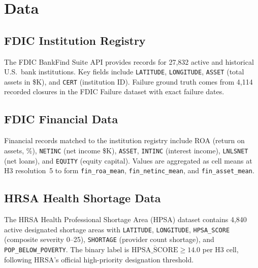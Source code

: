 \documentclass[conference]{IEEEtran}
\begin{document}
\section{Data}
\subsection{FDIC Institution Registry}
The FDIC BankFind Suite API provides records for 27,832 active and
historical U.S.\ bank institutions. Key fields include \texttt{LATITUDE},
\texttt{LONGITUDE}, \texttt{ASSET} (total assets in \$K), and
\texttt{CERT} (institution ID). Failure ground truth comes from 4,114
recorded closures in the FDIC Failure dataset with exact failure dates.
\subsection{FDIC Financial Data}
Financial records matched to the institution registry include
ROA (return on assets, \%), \texttt{NETINC} (net income \$K),
\texttt{ASSET}, \texttt{INTINC} (interest income), \texttt{LNLSNET}
(net loans), and \texttt{EQUITY} (equity capital). Values are aggregated
as cell means at H3 resolution~5 to form \texttt{fin\_roa\_mean},
\texttt{fin\_netinc\_mean}, and \texttt{fin\_asset\_mean}.
\subsection{HRSA Health Shortage Data}
The HRSA Health Professional Shortage Area (HPSA) dataset contains 4,840
active designated shortage areas with \texttt{LATITUDE},
\texttt{LONGITUDE}, \texttt{HPSA\_SCORE} (composite severity 0–25),
\texttt{SHORTAGE} (provider count shortage), and
\texttt{POP\_BELOW\_POVERTY}. The binary label is
$\overline{\text{HPSA\_SCORE}} \geq 14.0$ per H3 cell, following HRSA's
official high-priority designation threshold.
\end{document}
